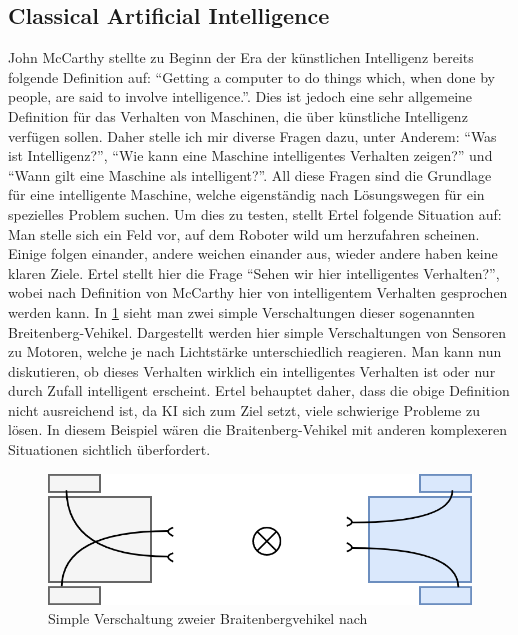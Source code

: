         \subsection{Classical Artificial Intelligence}\label{subsec:cai}
            John McCarthy stellte zu Beginn der Era der künstlichen Intelligenz bereits folgende Definition
            auf: ``Getting a computer to do things which, when done by people, are said to involve intelligence.''.
            \cite[p. 1]{ertel2016grundkurs} Dies ist jedoch eine sehr allgemeine Definition für das
            Verhalten von Maschinen, die über künstliche Intelligenz verfügen sollen. Daher stelle ich mir
            diverse Fragen dazu, unter Anderem: ``Was ist Intelligenz?'', ``Wie kann eine Maschine intelligentes
            Verhalten zeigen?'' und ``Wann gilt eine Maschine als intelligent?''. All diese Fragen sind die
            Grundlage für eine intelligente Maschine, welche eigenständig nach Lösungswegen für ein spezielles
            Problem suchen. Um dies zu testen, stellt Ertel folgende Situation auf: Man stelle sich ein Feld
            vor, auf dem Roboter wild um herzufahren scheinen. Einige folgen einander, andere weichen einander
            aus, wieder andere haben keine klaren Ziele. \cite[p. 2]{ertel2016grundkurs} Ertel stellt hier die
            Frage ``Sehen wir hier intelligentes Verhalten?'', wobei nach Definition von McCarthy hier von
            intelligentem Verhalten gesprochen werden kann. In \ref{pic:braitenberg-vehikel} sieht man zwei
            simple Verschaltungen dieser sogenannten Breitenberg-Vehikel. Dargestellt werden hier simple
            Verschaltungen von Sensoren zu Motoren, welche je nach Lichtstärke unterschiedlich reagieren.
            Man kann nun diskutieren, ob dieses Verhalten wirklich ein intelligentes Verhalten ist oder
            nur durch Zufall intelligent erscheint. Ertel behauptet daher, dass die obige Definition nicht
            ausreichend ist, da KI sich zum Ziel setzt, viele schwierige Probleme zu lösen. In diesem Beispiel
            wären die Braitenberg-Vehikel mit anderen komplexeren Situationen sichtlich überfordert.

            \begin{figure}[h]
                \begin{center}
                    \includegraphics[width=1.0\textwidth]{figures/braitenberg-roboter.png}
                    \caption[Verschaltung Braitenberg-Vehikel]{Simple Verschaltung zweier Braitenbergvehikel nach \cite{ertel2016grundkurs}}
                    \label{pic:braitenberg-vehikel}
                \end{center}
            \end{figure}

